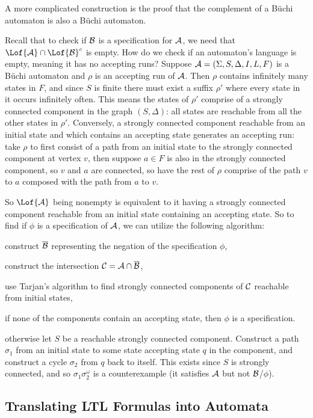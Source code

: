 A more complicated construction is the proof that the complement of a B\"uchi automaton is also a B\"uchi automaton.

Recall that to check if ${\cal B}$ is a specification for ${\cal A}$, we need that $\Lof{\cal A}\cap\Lof{\cal B}^c$ is empty.
How do we check if an automaton's language is empty, meaning it has no accepting runs?
Suppose ${\cal A}=(\Sigma,S,\Delta,I,L,F)$ is a B\"uchi automaton and $\rho$ is an accepting run of ${\cal A}$.
Then $\rho$ contains infinitely many states in $F$, and since $S$ is finite there must exist a suffix $\rho'$ where every state in it occurs infinitely often.
This means the states of $\rho'$ comprise of a strongly connected component in the graph $(S,\Delta)$: all states are reachable from all the other states in $\rho'$.
Conversely, a strongly connected component reachable from an initial state and which contains an accepting state generates an accepting run: take $\rho$ to first consist of a path from an initial state to
the strongly connected component at vertex $v$, then suppose $a\in F$ is also in the strongly connected component, so $v$ and $a$ are connected, so have the rest of $\rho$ comprise of the path $v$ to $a$
composed with the path from $a$ to $v$.

So $\Lof{\cal A}$ being nonempty is equivalent to it having a strongly connected component reachable from an initial state containing an accepting state.
So to find if $\phi$ is a specification of ${\cal A}$, we can utilize the following algorithm:
\benum
    \item construct $\overline{\cal B}$ representing the negation of the specification $\phi$,
    \item construct the intersection ${\cal C}={\cal A}\cap\overline{\cal B}$,
    \item use Tarjan's algorithm to find strongly connected components of ${\cal C}$ reachable from initial states,
    \item if none of the components contain an accepting state, then $\phi$ is a specification.\
    \item otherwise let $S$ be a reachable strongly connected component.
        Construct a path $\sigma_1$ from an initial state to some state accepting state $q$ in the component, and construct a cycle $\sigma_2$ from $q$ back to itself.
        This exists since $S$ is strongly connected, and so $\sigma_1\sigma_2^\omega$ is a counterexample (it satisfies ${\cal A}$ but not ${\cal B}$/$\phi$).
\eenum

\subsection{Translating LTL Formulas into Automata}

